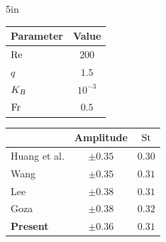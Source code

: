 \documentclass[10pt,english]{beamer}
\begin{document}
\begin{frame}
    \begin{columns}
        \begin{column}{5in}
            \small
            \centering
            
            \setlength{\tabcolsep}{3pt}
            \begin{tabular}[t]{@{}lc@{}}
                \toprule
                Parameter     & Value       \\
                \midrule
                \(\mathrm{Re}\) & \(200\)     \\
                \(q\)         & \(1.5\)     \\
                \(K_B\)       & \(10^{-3}\) \\
                \(\mathrm{Fr}\)       & \(0.5\)     \\
                \bottomrule
            \end{tabular}
            \hspace{0.25in}
            \begin{tabular}[t]{@{}lcc@{}}
                \toprule
                                                          & Amplitude             & \(\mathrm{St}\)           \\
                \midrule
                Huang et al. \cite{huang_simulation_2007} & \(\pm 0.35\)          & \(0.30\)          \\
                Wang \cite{wang_strongly_2015}            & \(\pm 0.35\)          & \(0.31\)          \\
                Lee \cite{lee_discrete-forcing_2015}      & \(\pm 0.38\)          & \(0.31\)          \\
                Goza \cite{goza_strongly-coupled_2016}    & \(\pm 0.38\)          & \(0.32\)          \\
                \textbf{Present}                          & \(\mathbf{\pm 0.36}\) & \(\mathbf{0.31}\) \\
                \bottomrule
            \end{tabular}
        \end{column}
    \end{columns}
\end{frame}
\end{document}

